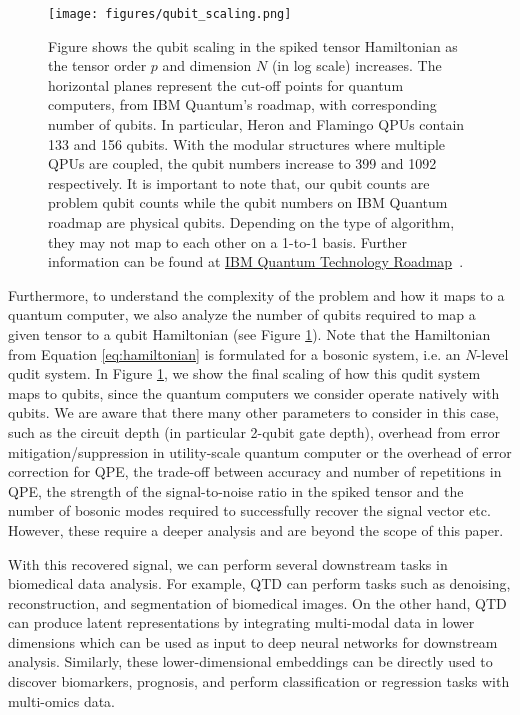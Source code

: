 \begin{figure}[H]
    \centering
    \texttt{[image: figures/qubit\_scaling.png]}
    \caption{Figure shows the qubit scaling in the spiked tensor Hamiltonian as the tensor order $p$ and dimension $N$ (in log scale) increases. The horizontal planes represent the cut-off points for quantum computers, from IBM Quantum's roadmap, with corresponding number of qubits. In particular, Heron and Flamingo QPUs contain 133 and 156 qubits. With the modular structures where multiple QPUs are coupled, the qubit numbers increase to 399 and 1092 respectively. It is important to note that, our qubit counts are problem qubit counts while the qubit numbers on IBM Quantum roadmap are physical qubits. Depending on the type of algorithm, they may not map to each other on a 1-to-1 basis. Further information can be found at \href{https://www.ibm.com/quantum/technology}{IBM Quantum Technology Roadmap}~\cite{gambetta2020ibm}.}
    \label{fig:qubits}
\end{figure}

Furthermore, to understand the complexity of the problem and how it maps to a quantum computer, we also analyze the number of qubits required to map a given tensor to a qubit Hamiltonian (see Figure \ref{fig:qubits}). Note that the Hamiltonian from Equation \ref{eq:hamiltonian} is formulated for a bosonic system, i.e. an $N$-level qudit system. In Figure \ref{fig:qubits}, we show the final scaling of how this qudit system maps to qubits, since the quantum computers we consider operate natively with qubits. We are aware that there many other parameters to consider in this case, such as the circuit depth (in particular 2-qubit gate depth), overhead from error mitigation/suppression in utility-scale quantum computer or the overhead of error correction for QPE, the trade-off between accuracy and number of repetitions in QPE, the strength of the signal-to-noise ratio in the spiked tensor and the number of bosonic modes required to successfully recover the signal vector etc. However, these require a deeper analysis and are beyond the scope of this paper.  

With this recovered signal, we can perform several downstream tasks in biomedical data analysis. For example, QTD can perform tasks such as denoising, reconstruction, and segmentation of biomedical images. On the other hand, QTD can produce latent representations by integrating multi-modal data in lower dimensions which can be used as input to deep neural networks for downstream analysis. Similarly, these lower-dimensional embeddings can be directly used to discover biomarkers, prognosis, and perform classification or regression tasks with multi-omics data.

